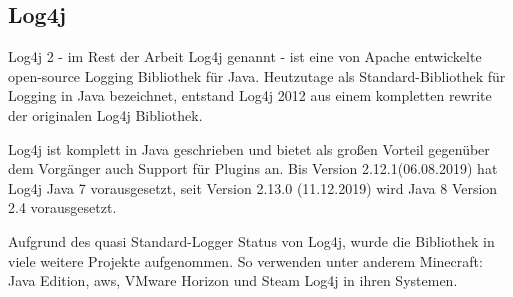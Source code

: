 
\subsection{Log4j}\label{subsec:log4j}
Log4j 2 - im Rest der Arbeit Log4j genannt - ist eine von Apache entwickelte open-source Logging Bibliothek für Java.
Heutzutage als Standard-Bibliothek für Logging in Java bezeichnet, entstand Log4j 2012 aus einem kompletten rewrite der originalen Log4j Bibliothek.

Log4j ist komplett in Java geschrieben und bietet als großen Vorteil gegenüber dem Vorgänger auch Support für Plugins an.
Bis Version 2.12.1(06.08.2019) hat Log4j Java 7 vorausgesetzt, seit Version 2.13.0 (11.12.2019) wird Java 8 Version 2.4 vorausgesetzt.

Aufgrund des quasi Standard-Logger Status von Log4j, wurde die Bibliothek in viele weitere Projekte aufgenommen.
So verwenden unter anderem Minecraft: Java Edition, \gls{aws}, VMware Horizon und Steam Log4j in ihren Systemen.
